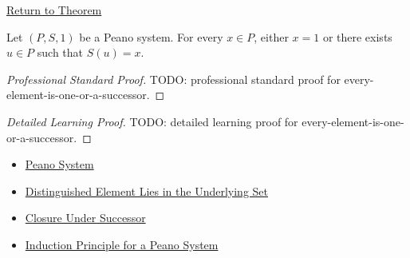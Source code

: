 \newpage
{}
\label{prf:every-element-is-one-or-a-successor}

\begin{remark*}[Return]
\hyperref[thm:every-element-is-one-or-a-successor]{Return to Theorem}
\end{remark*}

\begin{theorem*}
Let $(P,S,1)$ be a Peano system. For every $x \in P$, either $x=1$ or there
exists $u \in P$ such that $S(u)=x$.
\end{theorem*}

\begin{proof}[Professional Standard Proof]
\LRAProofBodyStart
TODO: professional standard proof for every-element-is-one-or-a-successor.
\end{proof}

\begin{proof}[Detailed Learning Proof]
\LRAProofBodyStart
TODO: detailed learning proof for every-element-is-one-or-a-successor.
\end{proof}

\begin{remark*}
\end{remark*}

\begin{dependencies}
\begin{itemize}
  \item \hyperref[def:peano-system]{Peano System}
  \item \hyperref[ax:peano-base-in-set]{Distinguished Element Lies in the Underlying Set}
  \item \hyperref[ax:peano-successor-closure]{Closure Under Successor}
  \item \hyperref[thm:induction-principle-for-peano-system]{Induction Principle for a Peano System}
\end{itemize}
\end{dependencies}


\clearpage
